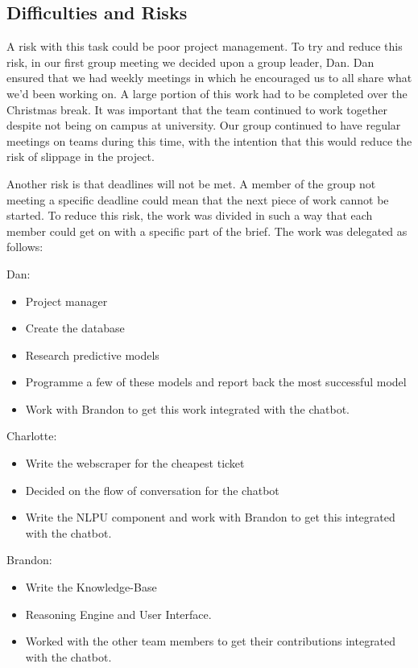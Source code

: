 \documentclass[11pt]{article}
\begin{document}
	\subsection{Difficulties and Risks}
	
A risk with this task could be poor project management. To try and reduce this risk, in our first group meeting we decided upon a group leader, Dan. Dan ensured that we had weekly meetings in which he encouraged us to all share what we’d been working on. A large portion of this work had to be completed over the Christmas break. It was important that the team continued to work together despite not being on campus at university. Our group continued to have regular meetings on teams during this time, with the intention that this would reduce the risk of slippage in the project. 

Another risk is that deadlines will not be met. A member of the group not meeting a specific deadline could mean that the next piece of work cannot be started. To reduce this risk, the work was divided in such a way that each member could get on with a specific part of the brief. The work was delegated as follows:


Dan:
\begin{itemize}
	\item Project manager
	\item Create the database
	\item Research predictive models
	\item Programme a few of these models and report back the most successful model
	\item Work with Brandon to get this work integrated with the chatbot.
\end{itemize}
Charlotte:
\begin{itemize}
	\item Write the webscraper for the cheapest ticket
	\item Decided on the flow of conversation for the chatbot
	\item Write the NLPU component and work with Brandon to get this integrated with the chatbot.
\end{itemize}
Brandon: 
\begin{itemize}
	\item Write the Knowledge-Base
	\item Reasoning Engine and User Interface. 
	\item Worked with the other team members to get their contributions integrated with the chatbot. 
\end{itemize}
\end{document}

